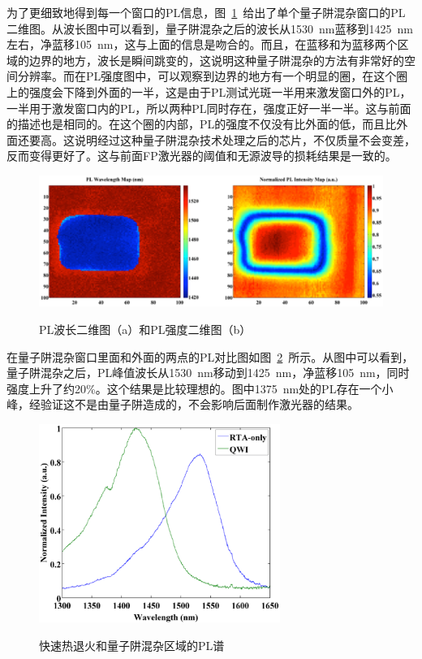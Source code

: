 \documentclass{ZJUthesis}
\begin{document}
为了更细致地得到每一个窗口的PL信息，图~\ref{fig_double_pl3}~给出了单个量子阱混杂窗口的PL二维图。从波长图中可以看到，量子阱混杂之后的波长从1530~nm蓝移到1425~nm左右，净蓝移105~nm，这与上面的信息是吻合的。而且，在蓝移和为蓝移两个区域的边界的地方，波长是瞬间跳变的，这说明这种量子阱混杂的方法有非常好的空间分辨率。而在PL强度图中，可以观察到边界的地方有一个明显的圈，在这个圈上的强度会下降到外面的一半，这是由于PL测试光斑一半用来激发窗口外的PL，一半用于激发窗口内的PL，所以两种PL同时存在，强度正好一半一半。这与前面的描述也是相同的。在这个圈的内部，PL的强度不仅没有比外面的低，而且比外面还要高。这说明经过这种量子阱混杂技术处理之后的芯片，不仅质量不会变差，反而变得更好了。这与前面FP激光器的阈值和无源波导的损耗结果是一致的。

\begin{figure}[htbp]
  \centering
  \includegraphics[width=1.0\textwidth]{./Pictures/double_pl3.eps}\\
  \caption{PL波长二维图（a）和PL强度二维图（b）}
  \label{fig_double_pl3}
\end{figure}

在量子阱混杂窗口里面和外面的两点的PL对比图如图~\ref{fig_double_pl4}~所示。从图中可以看到，量子阱混杂之后，PL峰值波长从1530~nm移动到1425~nm，净蓝移105~nm，同时强度上升了约20\%。这个结果是比较理想的。图中1375~nm处的PL存在一个小峰，经验证这不是由量子阱造成的，不会影响后面制作激光器的结果。

\begin{figure}[htbp]
  \centering
  \includegraphics[width=0.7\textwidth]{./Pictures/double_pl4.eps}\\
  \caption{快速热退火和量子阱混杂区域的PL谱}
  \label{fig_double_pl4}
\end{figure}
\end{document}
